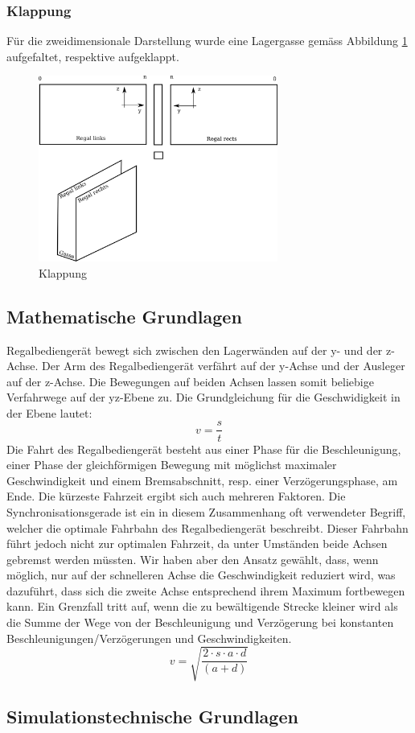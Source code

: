 \subsubsection{Klappung}
Für die zweidimensionale Darstellung wurde eine Lagergasse gemäss Abbildung \ref{fig:klapp} aufgefaltet, respektive aufgeklappt.
%
\begin{figure}[H]
  \begin{center}
    \includegraphics[width=0.7\textwidth]{images/klappung.png}
    \caption{Klappung}
    \label{fig:klapp}
  \end{center}
\end{figure}

%
\subsection{Mathematische Grundlagen}
Regalbediengerät bewegt sich zwischen den Lagerwänden auf der y- und der z-Achse. Der Arm des Regalbediengerät verfährt auf der y-Achse und der Ausleger auf der z-Achse. Die Bewegungen auf beiden Achsen lassen somit beliebige Verfahrwege auf der yz-Ebene zu. 
%
Die Grundgleichung für die Geschwidigkeit in der Ebene lautet:
%
\begin{equation}
v = \frac{s}{t}
\end{equation}
%
Die Fahrt des Regalbediengerät besteht aus einer Phase für die Beschleunigung, einer Phase der gleichförmigen Bewegung mit möglichst maximaler Geschwindigkeit und einem Bremsabschnitt, resp. einer Verzögerungsphase, am Ende. 
%
Die kürzeste Fahrzeit ergibt sich auch mehreren Faktoren. Die Synchronisationsgerade ist ein in diesem Zusammenhang oft verwendeter Begriff, welcher die optimale Fahrbahn des Regalbediengerät beschreibt. Dieser Fahrbahn führt jedoch nicht zur optimalen Fahrzeit, da unter Umständen beide Achsen gebremst werden müssten. Wir haben aber den Ansatz gewählt, dass, wenn möglich, nur auf der schnelleren Achse die Geschwindigkeit reduziert wird, was dazuführt, dass sich die zweite Achse entsprechend ihrem Maximum fortbewegen kann.
%
Ein Grenzfall tritt auf, wenn die zu bewältigende Strecke kleiner wird als die Summe der Wege von der Beschleunigung und Verzögerung bei konstanten Beschleunigungen/Verzögerungen und Geschwindigkeiten. 
%
\begin{equation}
v = \sqrt{\frac{2 \cdot s \cdot a \cdot d}{(a+d)}}
\end{equation}
%
\subsection{Simulationstechnische Grundlagen}






